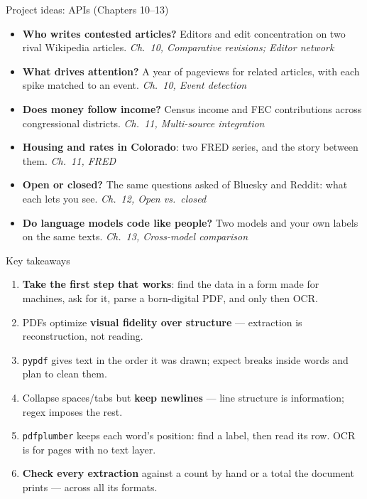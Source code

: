 \documentclass[9pt,aspectratio=169]{beamer}
\begin{document}
\begin{frame}{Project ideas: APIs (Chapters 10--13)}
    \begin{itemize}\small
        \item \textbf{Who writes contested articles?} Editors and edit concentration on two rival Wikipedia articles. \hfill \textit{Ch.~10, Comparative revisions; Editor network}
        \item \textbf{What drives attention?} A year of pageviews for related articles, with each spike matched to an event. \hfill \textit{Ch.~10, Event detection}
        \item \textbf{Does money follow income?} Census income and FEC contributions across congressional districts. \hfill \textit{Ch.~11, Multi-source integration}
        \item \textbf{Housing and rates in Colorado}: two FRED series, and the story between them. \hfill \textit{Ch.~11, FRED}
        \item \textbf{Open or closed?} The same questions asked of Bluesky and Reddit: what each lets you see. \hfill \textit{Ch.~12, Open vs.\ closed}
        \item \textbf{Do language models code like people?} Two models and your own labels on the same texts. \hfill \textit{Ch.~13, Cross-model comparison}
    \end{itemize}
\end{frame}

\begin{frame}{Key takeaways}
    \begin{enumerate}
        \item \textbf{Take the first step that works}: find the data in a form made for machines, ask for it, parse a born-digital PDF, and only then OCR.
        \item PDFs optimize \textbf{visual fidelity over structure} --- extraction is reconstruction, not reading.
        \item \texttt{pypdf} gives text in the order it was drawn; expect breaks inside words and plan to clean them.
        \item Collapse spaces/tabs but \textbf{keep newlines} --- line structure is information; regex imposes the rest.
        \item \texttt{pdfplumber} keeps each word's position: find a label, then read its row. OCR is for pages with no text layer.
        \item \textbf{Check every extraction} against a count by hand or a total the document prints --- across all its formats.
    \end{enumerate}
    \bigskip
\end{frame}
\end{document}
